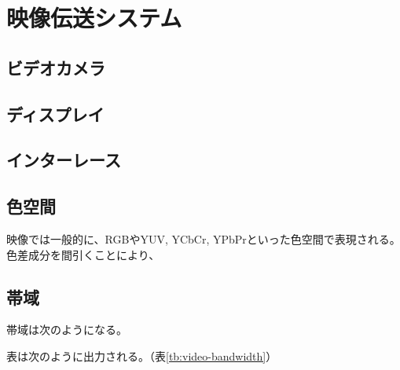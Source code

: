 \chapter{映像伝送システム}
\label{chap:video-transmission}
\section{ビデオカメラ}



\section{ディスプレイ}



\section{インターレース}



\section{色空間}

映像では一般的に、RGBやYUV, YCbCr, YPbPrといった色空間で表現される。
色差成分を間引くことにより、

\section{帯域}

帯域は次のようになる。

表は次のように出力される。（表\ref{tb:video-bandwidth}）

